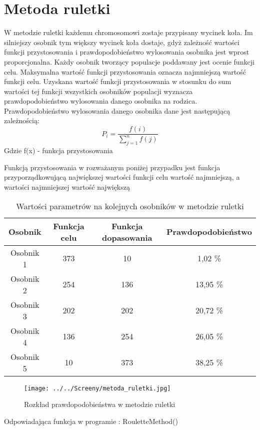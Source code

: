 
\section{Metoda ruletki}\label{sec:narzedzia}


W metodzie ruletki każdemu chromosomowi zostaje przypisany wycinek koła. Im silniejszy osobnik tym większy wycinek koła dostaje, gdyż zależność wartości funkcji przystosowania i prawdopodobieństwo wylosowania osobnika jest wprost proporcjonalna. Każdy osobnik tworzący populacje poddawany jest ocenie funkcji celu. Maksymalna wartość funkcji przystosowania oznacza najmniejszą wartość funkcji celu. Uzyskana wartość funkcji przystosowania w stosunku do sum wartości tej funkcji wszystkich osobników populacji wyznacza prawdopodobieństwo wylosowania danego osobnika na rodzica. Prawdopodobieństwo wylosowania danego osobnika dane jest następującą zależnością:
$$
P_i = \frac{f(i)}{\sum_{j=1}^{n}f(j)}
$$
Gdzie f(x) - funkcja przystosowania\\
\par
Funkcją przystosowania w rozważanym poniżej przypadku jest funkcja przyporządkowującą największej wartości funkcji celu wartość najmniejszą, a wartości najmniejszej wartość największą

\begin{table}
\begin{center}
\begin{tabular}{|c|c|c|c|}
\hline
\textbf{Osobnik}  & \textbf{Funkcja celu} & \textbf{Funkcja dopasowania} & \textbf{Prawdopodobieństwo}\\
\hline
Osobnik 1 & 373 & 10 & 1,02  \% \\
\hline
Osobnik 2 &254 & 136  & 13,95  \% \\
\hline
Osobnik 3 & 202 & 202 & 20,72  \% \\
\hline
Osobnik 4 & 136 & 254 & 26,05  \% \\
\hline
Osobnik 5 & 10 & 373 & 38,25  \% \\
\hline
\end{tabular}
\caption{Wartości parametrów na kolejnych osobników w metodzie ruletki}
\end{center}
\end{table}

\vspace{0,4cm}

\begin{figure}[h]
		\texttt{[image: ../../Screeny/metoda\_ruletki.jpg]}
		\caption{Rozkład prawdopodobieństwa w metodzie ruletki}
		\label{ruletka}			
\end{figure}
\par
Odpowiadająca funkcja w programie : RouletteMethod()

